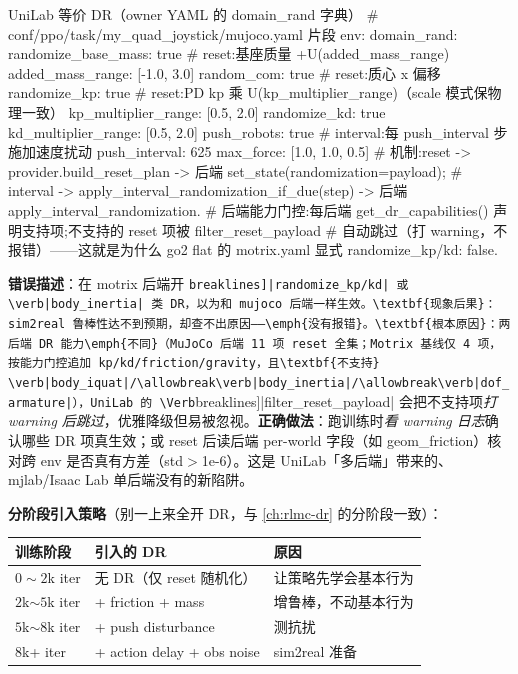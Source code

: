 \begin{codebox}[Python]{UniLab 等价 DR（owner YAML 的 domain\_rand 字典）}
# conf/ppo/task/my_quad_joystick/mujoco.yaml 片段
env:
  domain_rand:
    randomize_base_mass: true          # reset:基座质量 +U(added_mass_range)
    added_mass_range: [-1.0, 3.0]
    random_com: true                   # reset:质心 x 偏移
    randomize_kp: true                 # reset:PD kp 乘 U(kp_multiplier_range)（scale 模式保物理一致）
    kp_multiplier_range: [0.5, 2.0]
    randomize_kd: true
    kd_multiplier_range: [0.5, 2.0]
    push_robots: true                  # interval:每 push_interval 步施加速度扰动
    push_interval: 625
    max_force: [1.0, 1.0, 0.5]
# 机制:reset -> provider.build_reset_plan -> 后端 set_state(randomization=payload);
#       interval -> apply_interval_randomization_if_due(step) -> 后端 apply_interval_randomization.
# 后端能力门控:每后端 get_dr_capabilities() 声明支持项;不支持的 reset 项被 filter_reset_payload
#   自动跳过（打 warning，不报错）——这就是为什么 go2 flat 的 motrix.yaml 显式 randomize_kp/kd: false.
\end{codebox}

\begin{pitfall}
\textbf{错误描述}：在 motrix 后端开 \Verb[breaklines]|randomize_kp/kd| 或 \verb|body_inertia| 类 DR，以为和 mujoco 后端一样生效。\textbf{现象后果}：sim2real 鲁棒性达不到预期，却查不出原因——\emph{没有报错}。\textbf{根本原因}：两后端 DR 能力\emph{不同}（MuJoCo 后端 11 项 reset 全集；Motrix 基线仅 4 项，按能力门控追加 kp/kd/friction/gravity，且\textbf{不支持} \verb|body_iquat|/\allowbreak\verb|body_inertia|/\allowbreak\verb|dof_armature|），UniLab 的 \Verb[breaklines]|filter_reset_payload| 会把不支持项\emph{打 warning 后跳过}，优雅降级但易被忽视。\textbf{正确做法}：跑训练时\emph{看 warning 日志}确认哪些 DR 项真生效；或 reset 后读后端 per-world 字段（如 geom\_friction）核对跨 env 是否真有方差（std$>$1e-6）。这是 UniLab「多后端」带来的、mjlab/Isaac Lab 单后端没有的新陷阱。
\end{pitfall}

\textbf{分阶段引入策略}（别一上来全开 DR，与 \cref{ch:rlmc-dr} 的分阶段一致）：

\begin{center}
\small
\begin{tabular}{@{}lp{4.8cm}p{4.4cm}@{}}
\toprule
训练阶段 & 引入的 DR & 原因 \\
\midrule
$0\sim 2$k iter & 无 DR（仅 reset 随机化） & 让策略先学会基本行为 \\
$2$k$\sim 5$k iter & + friction + mass & 增鲁棒，不动基本行为 \\
$5$k$\sim 8$k iter & + push disturbance & 测抗扰 \\
$8$k+ iter & + action delay + obs noise & sim2real 准备 \\
\bottomrule
\end{tabular}
\end{center}

